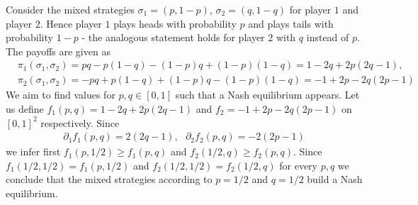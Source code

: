 \begin{example}\label{ex:pennies_mixed}
    Consider the mixed strategies $\sigma_{1} = (p, 1 - p)$, $\sigma_{2} = (q, 1 - q)$ for player $1$ and player $2$. Hence player $1$ plays heads
    with probability $p$ and plays tails with probability $1 - p$ - the analogous statement holds for player $2$ with $q$ instead of $p$. 
    The payoffs are given as
    \begin{align*}
        &\pi_{1}(\sigma_{1}, \sigma_{2}) = pq - p(1 - q) - (1 - p)q + (1 - p)(1 - q) = 1 - 2q + 2p(2q - 1), \\
        &\pi_{2}(\sigma_{1}, \sigma_{2}) = -pq + p(1 - q) + (1 - p)q - (1 - p)(1 - q) = -1 + 2p - 2q(2p - 1)
    \end{align*}
    We aim to find values for $p, q \in[0, 1]$ such that a Nash equilibrium appears. Let us define $f_{1}(p, q) = 1 - 2q + 2p(2q - 1)$ and 
    $f_{2} =  -1 + 2p - 2q(2p - 1)$ on $[0, 1]^{2}$ respectively. Since
    \begin{align*}
        \partial_{1}f_{1}(p, q) = 2(2q - 1), ~~~ \partial_{2}f_{2}(p, q) = -2(2p - 1)
    \end{align*}
    we infer first $f_{1}(p, 1 / 2)\geq f_{1}(p, q)$ and $f_{2}(1 / 2, q)\geq f_{2}(p, q)$. Since $f_{1}(1 / 2, 1 / 2) = f_{1}(p, 1 / 2)$ and 
    $f_{2}(1 / 2, 1 / 2) = f_{2}(1 / 2, q)$ for every $p, q$ we conclude that the mixed strategies according to $p = 1 / 2$ and $q = 1 / 2$ 
    build a Nash equilibrium.
\end{example}

